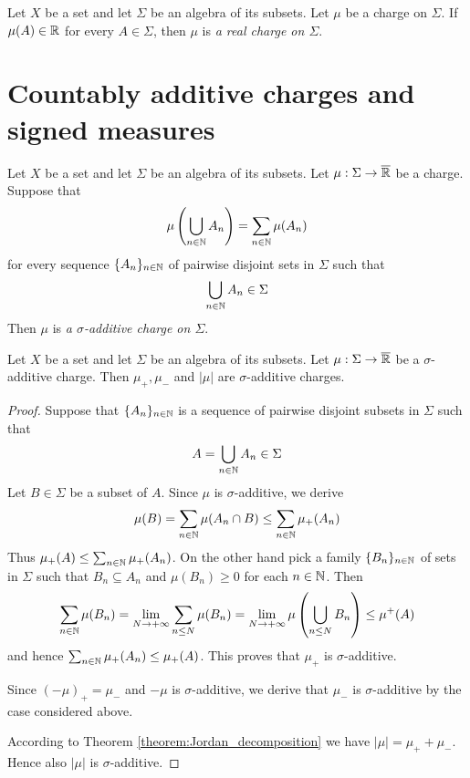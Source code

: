 \begin{definition}
    Let $X$ be a set and let $\Sigma$ be an algebra of its subsets. Let $\mu$ be a charge on $\Sigma$. If $\mu(A) \in {\mathbb R}$ for every $A \in \Sigma$, then $\mu$ is \textit{a real charge on $\Sigma$}.
\end{definition}


\section{Countably additive charges and signed measures}

\begin{definition}
    Let $X$ be a set and let $\Sigma$ be an algebra of its subsets. Let $\mu:\Sigma \rightarrow \overline{{\mathbb R}}$ be a charge. Suppose that
    $$\mu\left(\bigcup_{n\in {\mathbb N}}A_n\right) = \sum_{n \in {\mathbb N}}\mu(A_n)$$
    for every sequence $\{A_n\}_{n\in {\mathbb N}}$ of pairwise disjoint sets in $\Sigma$ such that
    $$\bigcup_{n\in {\mathbb N}}A_n \in \Sigma$$
    Then $\mu$ is \textit{a $\sigma$-additive charge on $\Sigma$}.
\end{definition}

\begin{proposition}\label{proposition:sigma_additive_have_positive_and_negative_parts_which_are_sigma_additive}
    Let $X$ be a set and let $\Sigma$ be an algebra of its subsets. Let $\mu:\Sigma \rightarrow \overline{{\mathbb R}}$ be a $\sigma$-additive charge. Then $\mu_+,\mu_-$ and $|\mu|$ are $\sigma$-additive charges.
\end{proposition}
\begin{proof}
    Suppose that $\{A_n\}_{n\in {\mathbb N}}$ is a sequence of pairwise disjoint subsets in $\Sigma$ such that
    $$A = \bigcup_{n\in {\mathbb N}}A_n \in \Sigma$$
    Let $B \in \Sigma$ be a subset of $A$. Since $\mu$ is $\sigma$-additive, we derive
    $$\mu(B) = \sum_{n\in {\mathbb N}}\mu(A_n\cap B) \leq \sum_{n\in {\mathbb N}}\mu_+(A_n)$$
    Thus $\mu_+(A) \leq  \sum_{n\in {\mathbb N}}\mu_+(A_n)$. On the other hand pick a family $\{B_n\}_{n\in {\mathbb N}}$ of sets in $\Sigma$ such that $B_n\subseteq A_n$ and $\mu(B_n) \geq 0$ for each $n\in {\mathbb N}$. Then
    $$\sum_{n \in {\mathbb N}}\mu(B_n) = \lim_{N\rightarrow +\infty}\sum_{n\leq N}\mu(B_n) = \lim_{N \rightarrow +\infty}\mu\left(\bigcup_{n\leq N} B_n\right) \leq \mu^+(A)$$
    and hence $\sum_{n \in {\mathbb N}}\mu_+(A_n) \leq \mu_+(A)$. This proves that $\mu_+$ is $\sigma$-additive.

    Since $(-\mu)_+ = \mu_-$ and $-\mu$ is $\sigma$-additive, we derive that $\mu_-$ is $\sigma$-additive by the case considered above.

    According to Theorem \ref{theorem:Jordan_decomposition} we have $|\mu| = \mu_+ + \mu_-$. Hence also $|\mu|$ is $\sigma$-additive.
\end{proof}

